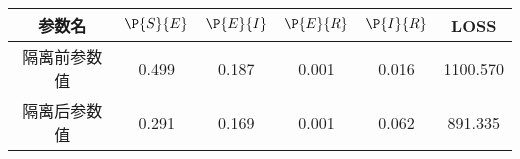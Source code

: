 \begin{tabular}{cccccc}
\hline
参数名&$\P{S}{E}$&$\P{E}{I}$&$\P{E}{R}$&$\P{I}{R}$&LOSS\\
\hline
隔离前参数值&0.499&0.187&0.001&0.016&1100.570\\
隔离后参数值&0.291&0.169&0.001&0.062&891.335\\
\hline
\end{tabular}
